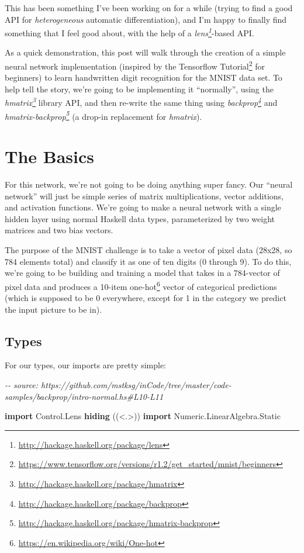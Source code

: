 \documentclass[]{article}
\newenvironment{Shaded}{}{}
\newcommand{\CommentTok}[1]{\textcolor[rgb]{0.38,0.63,0.69}{\textit{#1}}}
\newcommand{\DataTypeTok}[1]{\textcolor[rgb]{0.56,0.13,0.00}{#1}}
\newcommand{\KeywordTok}[1]{\textcolor[rgb]{0.00,0.44,0.13}{\textbf{#1}}}
\newcommand{\NormalTok}[1]{#1}
\renewcommand{\href}[2]{#2\footnote{\url{#1}}}
\begin{document}
This has been something I've been working on for a while (trying to find a good
API for \emph{heterogeneous} automatic differentiation), and I'm happy to
finally find something that I feel good about, with the help of a
\emph{\href{http://hackage.haskell.org/package/lens}{lens}}-based API.

As a quick demonstration, this post will walk through the creation of a simple
neural network implementation (inspired by the
\href{https://www.tensorflow.org/versions/r1.2/get_started/mnist/beginners}{Tensorflow
Tutorial} for beginners) to learn handwritten digit recognition for the MNIST
data set. To help tell the story, we're going to be implementing it
``normally'', using the
\emph{\href{http://hackage.haskell.org/package/hmatrix}{hmatrix}} library API,
and then re-write the same thing using
\emph{\href{http://hackage.haskell.org/package/backprop}{backprop}} and
\emph{\href{http://hackage.haskell.org/package/hmatrix-backprop}{hmatrix-backprop}}
(a drop-in replacement for \emph{hmatrix}).

\section{The Basics}\label{the-basics}

For this network, we're not going to be doing anything super fancy. Our ``neural
network'' will just be simple series of matrix multiplications, vector
additions, and activation functions. We're going to make a neural network with a
single hidden layer using normal Haskell data types, parameterized by two weight
matrices and two bias vectors.

The purpose of the MNIST challenge is to take a vector of pixel data (28x28, so
784 elements total) and classify it as one of ten digits (0 through 9). To do
this, we're going to be building and training a model that takes in a 784-vector
of pixel data and produces a 10-item
\href{https://en.wikipedia.org/wiki/One-hot}{one-hot} vector of categorical
predictions (which is supposed to be 0 everywhere, except for 1 in the category
we predict the input picture to be in).

\subsection{Types}\label{types}

For our types, our imports are pretty simple:

\begin{Shaded}
\begin{Highlighting}[]
\CommentTok{{-}{-} source: https://github.com/mstksg/inCode/tree/master/code{-}samples/backprop/intro{-}normal.hs\#L10{-}L11}

\KeywordTok{import}           \DataTypeTok{Control.Lens} \KeywordTok{hiding}\NormalTok{          ((\textless{}.\textgreater{}))}
\KeywordTok{import}           \DataTypeTok{Numeric.LinearAlgebra.Static}
\end{Highlighting}
\end{Shaded}
\end{document}
